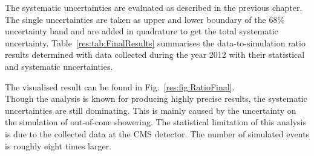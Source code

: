 The systematic uncertainties are evaluated as described in the previous chapter. 
The single uncertainties are taken as upper and lower boundary of the 68\% uncertainty band and are added in quadrature to get the total systematic uncertainty.
Table~\ref{res:tab:FinalResults} summarises the data-to-simulation ratio results determined with data collected during the year 2012 with their statistical and systematic uncertainties.
\renewcommand{\arraystretch}{1.5}
\begin{table}[t]
\centering
\caption{Data-to-simulation resolution scale factors \rhores with statistical and systematic uncertainties.}
\label{res:tab:FinalResults}
\large{
}
\end{table}  
The visualised result can be found in Fig.~\ref{res:fig:RatioFinal}.\\

Though the \GAMJET analysis is known for producing highly precise results, the systematic uncertainties are still dominating. 
This is mainly caused by the uncertainty on the simulation of out-of-cone showering.
The statistical limitation of this analysis is due to the collected data at the CMS detector.
The number of simulated events is roughly eight times larger.

 
